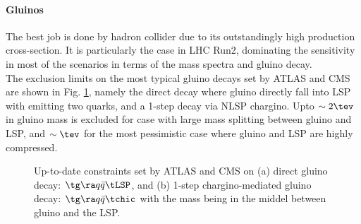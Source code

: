 \paragraph{Gluinos}
The best job is done by hadron collider due to its outstandingly high production cross-section.
It is particularly the case in LHC Run2, dominating the sensitivity in most of the scenarios in terms of the mass spectra and gluino decay. \\

The exclusion limits on the most typical gluino decays set by ATLAS and CMS are shown in Fig. \ref{fig::Introduction::LHCLimitGG}, namely the direct decay where gluino directly fall into LSP with emitting two quarks, and a 1-step decay via NLSP chargino. Upto $\sim 2\tev$ in gluino mass is excluded for case with large mass splitting between gluino and LSP, and $\sim \tev$ for the most pessimistic case where gluino and LSP are highly compressed.\\

\begin{figure}[h]
  \centering
    \caption{Up-to-date constraints set by ATLAS and CMS on (a) direct gluino decay: $\tg \ra q \bar{q} \tLSP$, and (b) 1-step chargino-mediated gluino decay: $\tg \ra q\bar{q} \tchic$ with the mass being in the middel between gluino and the LSP.}
    \label{fig::Introduction::LHCLimitGG}
\end{figure}


